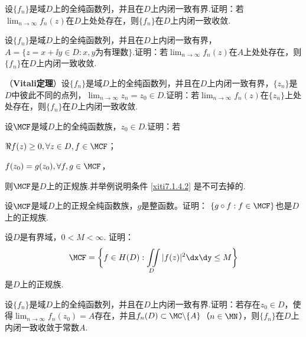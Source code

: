 \begin{xiti}
\item 设$\{f_n\}$是域$D$上的全纯函数列，并且在$D$上内闭一致有界.证明：若$\lim_{n\to\infty}f_n(z)$在$D$上处处存在，则$\{f_n\}$在$D$上内闭一致收敛.
\item 设$\{f_n\}$是域$D$上的全纯函数列，并且在$D$上内闭一致有界，$A=\{z=x+\ii y\in D:x,y\text{为有理数}\}$.证明：若$\lim_{n\to\infty}f_n(z)$在$A$上处处存在，则$\{f_n\}$在$D$上内闭一致收敛.
\item （\textbf{Vitali定理}）设$\{f_n\}$是域$D$上的全纯函数列，并且在$D$上内闭一致有界，$\{z_n\}$是$D$中彼此不同的点列，$\lim_{n\to\infty}z_n=z_0\in D$.证明：若$\lim_{n\to\infty}f_n(z)$在$\{z_n\}$上处处存在，则$\{f_n\}$在$D$上内闭一致收敛.
\item 设$\MCF$是域$D$上的全纯函数族，$z_0\in D$.证明：若
\begin{enuma}
  \item $\Re f(z)\ge0,\forall z\in D,f\in\MCF$；
  \item \label{xiti7.1.4.2}$f(z_0)=g(z_0),\forall f,g\in\MCF$，
\end{enuma}
则$\MCF$是$D$上的正规族.并举例说明条件 \ref{xiti7.1.4.2} 是不可去掉的.
\item 设$\MCF$是域$D$上的正规全纯函数族，$g$是整函数。证明：
$\{g\circ f:f\in\MCF\}$也是$D$上的正规族.
\item 设$D$是有界域，$0<M<\infty$. 证明：
\[\MCF=\bigg\{f\in H(D):\iint\limits_D|f(z)|^2\dx\dy\le M\bigg\}\]
是$D$上的正规族.
\item 设$\{f_n\}$是域$D$上的全纯函数列，并且在$D$上内闭一致有界.证明：若存在$z_0\in D$，使
得$\lim_{n\to\infty}f_n(z_0)=A$存在，并且$f_n(D)\subset\MC\backslash\{A\}$（$n\in\MN$），则$\{f_n\}$在$D$上内闭一致收敛于常数$A$.
\end{xiti}

